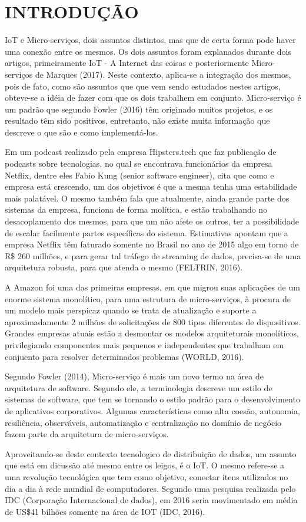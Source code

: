 \section{INTRODUÇÃO}

IoT e Micro-serviços, dois assuntos distintos, mas que de certa forma pode haver uma conexão entre os mesmos. Os dois assuntos foram explanados durante dois artigos, primeiramente IoT - A Internet das coisas e posteriormente Micro-serviços de Marques (2017). Neste contexto, aplica-se a integração dos mesmos, pois de fato, como são assuntos que que vem sendo estudados nestes artigos, obteve-se a idéia de fazer com que os dois trabalhem em conjunto. Micro-serviço é um padrão que segundo Fowler (2016) têm originado muitos projetos, e os resultado têm sido positivos, entretanto, não existe muita informação que descreve o que são e como implementá-los.

Em um podcast realizado pela empresa Hipsters.tech que faz publicação de podcasts sobre tecnologias, no qual se encontrava funcionários da empresa Netflix, dentre eles Fabio Kung (senior software engineer), cita que como e empresa está crescendo, um dos objetivos é que a mesma tenha uma estabilidade mais palatável. O mesmo também fala que atualmente, ainda grande parte dos sistemas da empresa, funciona de forma molítica, e estão trabalhando no desacoplamento dos mesmos, para que um não afete os outros, ter a possibilidade de escalar facilmente partes específicas do sistema. Estimativas apontam que a empresa Netflix têm faturado somente no Brasil no ano de 2015 algo em torno de R\$ 260 milhões, e para gerar tal tráfego de streaming de dados, precisa-se de uma arquitetura robusta, para que atenda o mesmo (FELTRIN, 2016).

A Amazon foi uma das primeiras empresas, em que migrou suas aplicações de um enorme sistema monolítico, para uma estrutura de micro-serviços, à procura de um modelo mais perspicaz quando se trata de atualização e suporte a aproximadamente 2 milhões de solicitações de 800 tipos diferentes de dispositivos. Grandes empresas atuais estão a desmontar os modelos arquiteturais monolíticos, privilegiando componentes mais pequenos e independentes que trabalham em conjuento para resolver determinados problemas (WORLD, 2016).

Segundo Fowler (2014), Micro-serviço é mais um novo termo na área de arquitetura de software. Segundo ele, a terminologia descreve um estilo de sistemas de software, que tem se tornando o estilo padrão para o desenvolvimento de aplicativos corporativos. Algumas características como alta coesão, autonomia, resiliência, observáveis, automatização e centralização no domínio de negócio fazem parte da arquitetura de micro-serviços. 

Aproveitando-se deste contexto tecnologico de distribuição de dados, um assunto que está em dicussão até mesmo entre os leigos, é o IoT. O mesmo refere-se a uma revolução tecnológica que tem como objetivo, conectar itens utilizados no dia a dia à rede mundial de computadores. Segundo uma pesquisa realizada pelo IDC (Corporação Internacional de dados), em 2016 seria movimentado em média de US\$41 bilhões somente na área de IOT (IDC, 2016).

